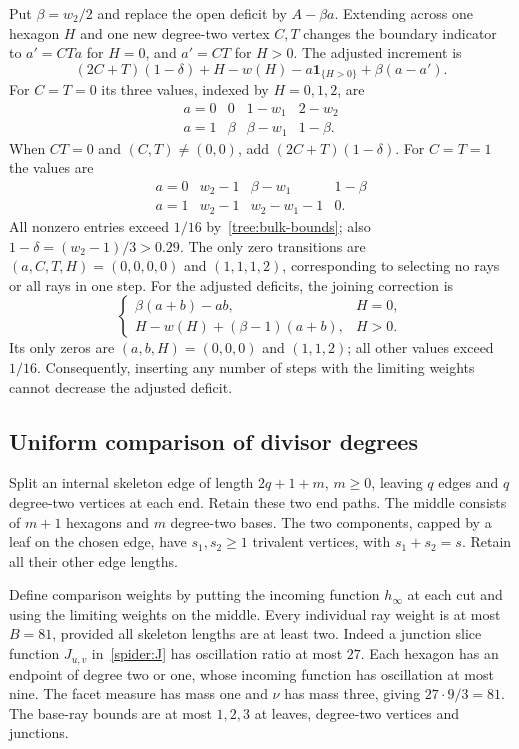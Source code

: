 Put $\beta=w_2/2$ and replace the open deficit by $A-\beta a$.
Extending across one hexagon $H$ and one new degree-two vertex $C,T$
changes the boundary indicator to $a'=CTa$ for $H=0$, and $a'=CT$ for
$H>0$. The adjusted increment is
\begin{equation}\label{tree:increment}
 (2C+T)(1-\delta)+H-w(H)-a\mathbf1_{\{H>0\}}
       +\beta(a-a').
\end{equation}
For $C=T=0$ its three values, indexed by $H=0,1,2$, are
\[
\begin{array}{c|ccc}
a=0&0&1-w_1&2-w_2\\
a=1&\beta&\beta-w_1&1-\beta.
\end{array}
\]
When $CT=0$ and $(C,T)\ne(0,0)$, add
$(2C+T)(1-\delta)$. For $C=T=1$ the values are
\[
\begin{array}{c|ccc}
a=0&w_2-1&\beta-w_1&1-\beta\\
a=1&w_2-1&w_2-w_1-1&0.
\end{array}
\]
All nonzero entries exceed $1/16$ by~\eqref{tree:bulk-bounds}; also
$1-\delta=(w_2-1)/3>0.29$. The only zero transitions are
$(a,C,T,H)=(0,0,0,0)$ and $(1,1,1,2)$, corresponding to selecting no
rays or all rays in one step. For the
adjusted deficits, the joining correction is
\begin{equation}\label{tree:adjusted-join}
 \begin{cases}
 \beta(a+b)-ab,&H=0,\\
 H-w(H)+(\beta-1)(a+b),&H>0.
 \end{cases}
\end{equation}
Its only zeros are $(a,b,H)=(0,0,0)$ and $(1,1,2)$; all other
values exceed $1/16$. Consequently, inserting any number of steps with
the limiting weights cannot decrease the adjusted deficit.

\subsection{Uniform comparison of divisor degrees}
Split an internal skeleton edge of length $2q+1+m$, $m\ge0$,
leaving $q$ edges and $q$ degree-two vertices at each end. Retain these
two end paths. The middle consists of $m+1$ hexagons
and $m$ degree-two bases. The two components, capped by a leaf on
the chosen edge, have $s_1,s_2\ge1$ trivalent vertices, with
$s_1+s_2=s$. Retain all their other edge lengths.

Define comparison weights by putting the incoming function $h_\infty$
at each cut and using the limiting weights on the middle. Every
individual ray weight is at most $B=81$, provided all skeleton
lengths are at least two. Indeed a junction slice function
$J_{u,v}$ in~\eqref{spider:J} has oscillation ratio at most $27$.
Each hexagon has an endpoint of degree two or one, whose incoming
function has oscillation at most nine. The facet measure has
mass one and $\nu$ has mass three, giving $27\cdot9/3=81$.
The base-ray bounds are at most $1,2,3$ at leaves, degree-two
vertices and junctions.

